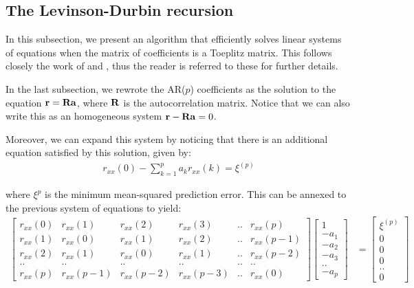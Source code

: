 \documentclass[../main.tex]{subfiles}
\begin{document}
\subsection{The Levinson-Durbin recursion} \label{subsection_levinson}
In this subsection, we present an algorithm that efficiently solves linear systems of equations when the matrix of coefficients is a Toeplitz matrix. This follows closely the work of \cite{Oppenheim2010} and \cite{Collomb2009}, thus the reader is referred to these for further details.
\par In the last subsection, we rewrote the AR($p$) coefficients as the solution to the equation $\mathbf{r} = \mathbf{Ra}$, where $\mathbf{R}$ is the autocorrelation matrix. Notice that we can also write this as an homogeneous system $\mathbf{r-Ra} = 0$. 
\par Moreover, we can expand this system by noticing that there is an additional equation satisfied by this solution, given by:
\begin{align*}
r_{xx}(0) - \sum_{k=1}^p{a_kr_{xx}(k)} = \xi^{(p)}
\end{align*}
\par where $\xi^p$ is the minimum mean-squared prediction error. This can be annexed to the previous system of equations to yield:
\begin{align*}
\begin{bmatrix} r_{xx}(0) & r_{xx}(1) & r_{xx}(2) & r_{xx}(3) & .. & r_{xx}(p) \\ r_{xx}(1) & r_{xx}(0) & r_{xx}(1) & r_{xx}(2) & .. & r_{xx}(p-1) \\ r_{xx}(2) & r_{xx}(1) & r_{xx}(0) & r_{xx}(1) & .. & r_{xx}(p-2) \\ .. & .. & .. & .. & ..  & .. \\ r_{xx}(p) & r_{xx}(p-1) & r_{xx}(p-2) & r_{xx}(p-3) & .. & r_{xx}(0) \end{bmatrix} \left[ \begin{array}{c} 1\\ -a_1 \\ -a_2 \\ -a_3 \\ .. \\ -a_p \end{array} \right] &= \left[ \begin{array}{c} \xi^{(p)} \\ 0 \\ 0 \\ 0 \\ .. \\ 0  \end{array} \right]
\end{align*}
\end{document}
